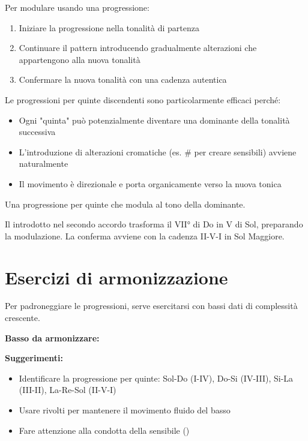 \begin{regola}
	\label{reg:modulazione_progressioni}
	Per modulare usando una progressione:
	
	\begin{enumerate}
		\item Iniziare la progressione nella tonalità di partenza
		\item Continuare il pattern introducendo gradualmente alterazioni che appartengono alla nuova tonalità
		\item Confermare la nuova tonalità con una cadenza autentica
	\end{enumerate}
	
	Le progressioni per quinte discendenti sono particolarmente efficaci perché:
	\begin{itemize}
		\item Ogni "quinta" può potenzialmente diventare una dominante della tonalità successiva
		\item L'introduzione di alterazioni cromatiche (es. \# per creare sensibili) avviene naturalmente
		\item Il movimento è direzionale e porta organicamente verso la nuova tonica
	\end{itemize}
\end{regola}

\begin{esempio}
	\label{ex:progressione_modulante}
	Una progressione per quinte che modula al tono della dominante.
	
	Il \Fadiesis  introdotto nel secondo accordo trasforma il VII° di Do in V di Sol, preparando la modulazione. La conferma avviene con la cadenza II-V-I in Sol Maggiore.
\end{esempio}

\section{Esercizi di armonizzazione}
\label{sec:esercizi_progressioni}

Per padroneggiare le progressioni, serve esercitarsi con bassi dati di complessità crescente.

\begin{esempio}
	\label{ex:esercizio_1}
	
	\textbf{Basso da armonizzare:}
	
	\textbf{Suggerimenti:}
	\begin{itemize}
		\item Identificare la progressione per quinte: Sol-Do (I-IV), Do-Si (IV-III), Si-La (III-II), La-Re-Sol (II-V-I)
		\item Usare rivolti per mantenere il movimento fluido del basso
		\item Fare attenzione alla condotta della sensibile (\Fadiesis )
	\end{itemize}
\end{esempio}

